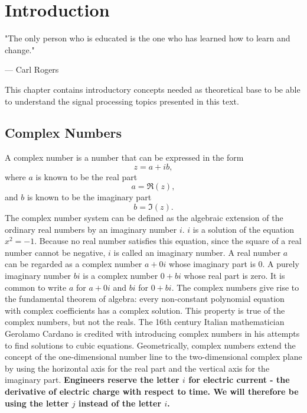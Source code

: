 \documentclass[12pt,oneside,openany]{memoir}
\numberwithin{equation}{subsection}
\begin{document}
\chapter{Introduction}
\epigraph{
	"The only person who is educated is the one who has learned how to
	learn and change."
}{--- \textup{Carl Rogers}}

This chapter contains introductory concepts needed as theoretical base to be
able to understand the signal processing topics presented in this text.


\section{Complex Numbers}
A complex number is a number that can be expressed in the form
\[z = a + ib,\]
where \(a\) is known to be the real part
\[a = \Re(z),\]
and \(b\) is known to be the imaginary part
\[b = \Im(z).\]
The complex number system can be defined as the algebraic extension of the
ordinary real numbers by an imaginary number \(i\). \(i\) is a solution of
the equation \(x^2 = −1\). Because no real number satisfies this equation, since
the square of a real number cannot be negative, \(i\) is called an imaginary
number.
\bigbreak
A real number \(a\) can be regarded as a complex number \(a + 0i\) whose
imaginary part is \(0\). A purely imaginary number \(bi\) is a complex number
\(0 + bi\) whose real part is zero. It is common to write \(a\) for \(a + 0i\)
and \(bi\) for \(0 + bi\).
\bigbreak
The complex numbers give rise to the fundamental theorem of algebra: every
non-constant polynomial equation with complex coefficients has a complex
solution. This property is true of the complex numbers, but not the reals. The
16th century Italian mathematician Gerolamo Cardano is credited with introducing
complex numbers in his attempts to find solutions to cubic equations.
\bigbreak
Geometrically, complex numbers extend the concept of the one-dimensional number
line to the two-dimensional complex plane by using the horizontal axis for the
real part and the vertical axis for the imaginary part.
\bigbreak
\textbf{Engineers reserve the letter \(i\) for electric current - the derivative
of electric charge with respect to time. We will therefore be using the letter
\(j\) instead of the letter \(i\).}

\end{document}
